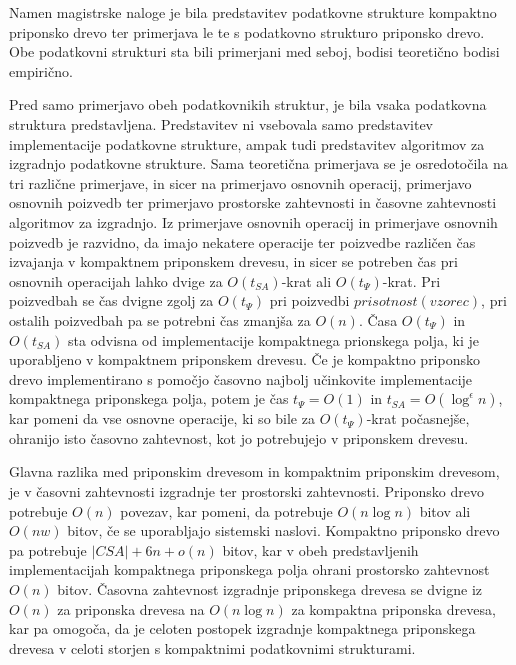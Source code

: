 Namen magistrske naloge je bila predstavitev podatkovne strukture kompaktno priponsko drevo ter primerjava le te s podatkovno strukturo priponsko drevo. Obe podatkovni strukturi sta bili primerjani med seboj, bodisi teoretično bodisi empirično.

Pred samo primerjavo obeh podatkovnikih struktur, je bila vsaka podatkovna struktura predstavljena. Predstavitev ni vsebovala samo predstavitev implementacije podatkovne strukture, ampak tudi predstavitev algoritmov za izgradnjo podatkovne strukture. Sama teoretična primerjava se je osredotočila na tri različne primerjave, in sicer na primerjavo osnovnih operacij, primerjavo osnovnih poizvedb ter primerjavo prostorske zahtevnosti in časovne zahtevnosti algoritmov za izgradnjo. Iz primerjave osnovnih operacij in primerjave osnovnih poizvedb je razvidno, da imajo nekatere operacije ter poizvedbe različen čas izvajanja v kompaktnem priponskem drevesu, in sicer se potreben čas pri osnovnih operacijah lahko dvige za $O(t_{SA})$-krat ali $O(t_\Psi)$-krat. Pri poizvedbah se čas dvigne zgolj za $O(t_\Psi)$ pri poizvedbi $prisotnost(vzorec)$, pri ostalih poizvedbah pa se potrebni čas zmanjša za $O(n)$. Časa $O(t_\Psi)$ in $O(t_{SA})$ sta odvisna od implementacije kompaktnega prionskega polja, ki je uporabljeno v kompaktnem priponskem drevesu. Če je kompaktno priponsko drevo implementirano s pomočjo časovno najbolj učinkovite implementacije kompaktnega priponskega polja, potem je čas $t_\Psi=O(1)$ in $t_{SA}=O(\log^\epsilon{n})$, kar pomeni da vse osnovne operacije, ki so bile za $O(t_\Psi)$-krat počasnejše, ohranijo isto časovno zahtevnost, kot jo potrebujejo v priponskem drevesu. 

Glavna razlika med priponskim drevesom in kompaktnim priponskim drevesom, je v časovni zahtevnosti izgradnje ter prostorski zahtevnosti. Priponsko drevo potrebuje $O(n)$ povezav, kar pomeni, da potrebuje $O(n\log{n})$ bitov ali $O(nw)$ bitov, če se uporabljajo sistemski naslovi. Kompaktno priponsko drevo pa potrebuje $|CSA|+6n+o(n)$ bitov, kar v obeh predstavljenih implementacijah kompaktnega priponskega polja ohrani prostorsko zahtevnost $O(n)$ bitov. Časovna zahtevnost izgradnje priponskega drevesa se dvigne iz $O(n)$ za priponska drevesa na $O(n\log{n})$ za kompaktna priponska drevesa, kar pa omogoča, da je celoten postopek izgradnje kompaktnega priponskega drevesa v celoti storjen s kompaktnimi podatkovnimi strukturami.

